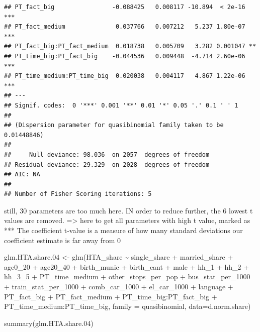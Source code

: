\documentclass[
]{article}
\newenvironment{Shaded}{\begin{snugshade}}{\end{snugshade}}
\newcommand{\AttributeTok}[1]{\textcolor[rgb]{0.77,0.63,0.00}{#1}}
\newcommand{\FloatTok}[1]{\textcolor[rgb]{0.00,0.00,0.81}{#1}}
\newcommand{\FunctionTok}[1]{\textcolor[rgb]{0.00,0.00,0.00}{#1}}
\newcommand{\NormalTok}[1]{#1}
\newcommand{\OtherTok}[1]{\textcolor[rgb]{0.56,0.35,0.01}{#1}}
\newcommand{\SpecialCharTok}[1]{\textcolor[rgb]{0.00,0.00,0.00}{#1}}
\begin{document}
\begin{verbatim}
## PT_fact_big                -0.088425   0.008117 -10.894  < 2e-16 ***
## PT_fact_medium              0.037766   0.007212   5.237 1.80e-07 ***
## PT_fact_big:PT_fact_medium  0.018738   0.005709   3.282 0.001047 ** 
## PT_time_big:PT_fact_big    -0.044536   0.009448  -4.714 2.60e-06 ***
## PT_time_medium:PT_time_big  0.020038   0.004117   4.867 1.22e-06 ***
## ---
## Signif. codes:  0 '***' 0.001 '**' 0.01 '*' 0.05 '.' 0.1 ' ' 1
## 
## (Dispersion parameter for quasibinomial family taken to be 0.01448846)
## 
##     Null deviance: 98.036  on 2057  degrees of freedom
## Residual deviance: 29.329  on 2028  degrees of freedom
## AIC: NA
## 
## Number of Fisher Scoring iterations: 5
\end{verbatim}

still, 30 parameters are too much here. IN order to reduce further, the
6 lowest t values are removed. =\textgreater{} here to get all
parameters with high t value, marked as *** The coefficient t-value is a
measure of how many standard deviations our coefficient estimate is far
away from 0

\begin{Shaded}
\begin{Highlighting}[]
\NormalTok{glm.HTA.share}\FloatTok{.04} \OtherTok{\textless{}{-}} \FunctionTok{glm}\NormalTok{(HTA\_share }\SpecialCharTok{\textasciitilde{}}\NormalTok{ single\_share }\SpecialCharTok{+}\NormalTok{ married\_share }\SpecialCharTok{+}\NormalTok{ age0\_20 }\SpecialCharTok{+} 
\NormalTok{                      age20\_40 }\SpecialCharTok{+}\NormalTok{ birth\_munic }\SpecialCharTok{+}\NormalTok{ birth\_cant }\SpecialCharTok{+}\NormalTok{ male }\SpecialCharTok{+}\NormalTok{ hh\_1 }\SpecialCharTok{+}\NormalTok{ hh\_2 }\SpecialCharTok{+} 
\NormalTok{                      hh\_3\_5 }\SpecialCharTok{+}\NormalTok{ PT\_time\_medium }\SpecialCharTok{+}\NormalTok{ other\_stops\_per\_pop }\SpecialCharTok{+} 
\NormalTok{                      bus\_stat\_per\_1000 }\SpecialCharTok{+}\NormalTok{ train\_stat\_per\_1000 }\SpecialCharTok{+}\NormalTok{ comb\_car\_1000 }\SpecialCharTok{+} 
\NormalTok{                      el\_car\_1000 }\SpecialCharTok{+}\NormalTok{ language }\SpecialCharTok{+}\NormalTok{ PT\_fact\_big }\SpecialCharTok{+}\NormalTok{ PT\_fact\_medium }\SpecialCharTok{+} 
\NormalTok{                      PT\_time\_big}\SpecialCharTok{:}\NormalTok{PT\_fact\_big }\SpecialCharTok{+}\NormalTok{ PT\_time\_medium}\SpecialCharTok{:}\NormalTok{PT\_time\_big,}
                \AttributeTok{family =}\NormalTok{ quasibinomial, }\AttributeTok{data=}\NormalTok{d.norm.share)}

\FunctionTok{summary}\NormalTok{(glm.HTA.share}\FloatTok{.04}\NormalTok{)}
\end{Highlighting}
\end{Shaded}
\end{document}
